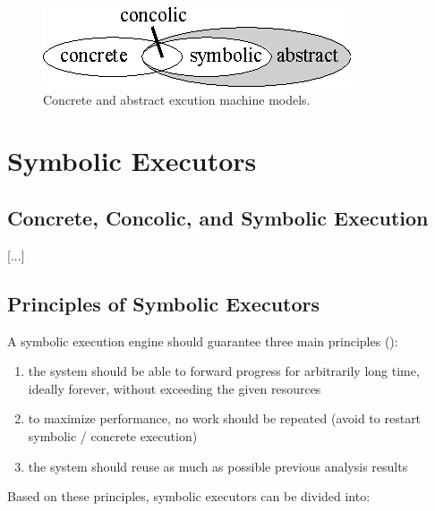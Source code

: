 
\begin{figure}[t]
\centering
\includegraphics[width=0.35\columnwidth]{images/concrete-abstract.eps} 
\caption{Concrete and abstract excution machine models.}
\label{fig:concrete-symbolic}
\end{figure}

\section{Symbolic Executors}

\subsection{Concrete, Concolic, and Symbolic Execution}
\label{ss:concrete-concolic-symbolic}

[...]

\subsection{Principles of Symbolic Executors}
\label{ss:principles}

A symbolic execution engine should guarantee three main principles (\cite{MAYHEM-SP12}):
\begin{enumerate}
  \item the system should be able to forward progress for arbitrarily long time, ideally forever, without exceeding the given resources
  \item to maximize performance, no work should be repeated (avoid to restart symbolic / concrete execution)
  \item the system should reuse as much as possible previous analysis results
\end{enumerate}

Based on these principles, symbolic executors can be divided into:

